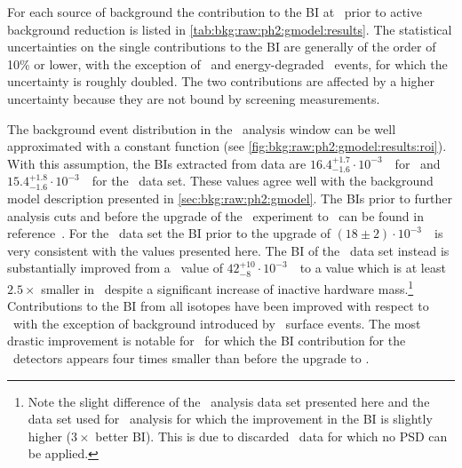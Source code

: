 For each source of background the contribution to the BI at \qbb\ prior to active
background reduction is listed in \cref{tab:bkg:raw:ph2:gmodel:results}. The statistical
uncertainties on the single contributions to the BI are generally of the order of 10\% or
lower, with the exception of \kvz\ and energy-degraded \a\ events, for which the
uncertainty is roughly doubled. The two contributions are affected by a higher uncertainty
because they are not bound by screening measurements.

The background event distribution in the \onbb\ analysis window can be well approximated
with a constant function (see \cref{fig:bkg:raw:ph2:gmodel:results:roi}).  With this
assumption, the BIs extracted from data are $16.4^{+1.7}_{-1.6} \cdot 10^{-3}$~\ctsper\
for \enrBEGeII\ and $15.4^{+1.8}_{-1.6} \cdot 10^{-3}$~\ctsper\ for the \enrCoaxII\ data
set.  These values agree well with the background model description presented in
\cref{sec:bkg:raw:ph2:gmodel}. The BIs prior to further analysis cuts and before the
upgrade of the \gerda\ experiment to \phasetwo\ can be found in
reference~\cite{Agostini2013c}. For the \enrCoaxII\ data set the BI prior to the upgrade
of $(18 \pm 2) \cdot 10^{-3}$~\ctsper\ is very consistent with the values presented here.
The BI of the \enrBEGeII\ data set instead is substantially improved from a \phaseone\
value of $42^{+10}_{-8} \cdot 10^{-3}$~\ctsper\ to a value which is at least $2.5\times$
smaller in \phasetwo\ despite a significant increase of inactive hardware
mass.\footnote{Note the slight difference of the \enrBEGeII\ analysis data set presented
here and the data set used for \onbb\ analysis for which the improvement in the BI is
slightly higher ($3\times$ better BI). This is due to discarded \bege\ data for which no
PSD can be applied.} Contributions to the BI from all isotopes have been improved with
respect to \phaseone\ with the exception of background introduced by \a\ surface events.
The most drastic improvement is notable for \kvz\ for which the BI contribution for the
\bege\ detectors appears four times smaller than before the upgrade to \phasetwo.

